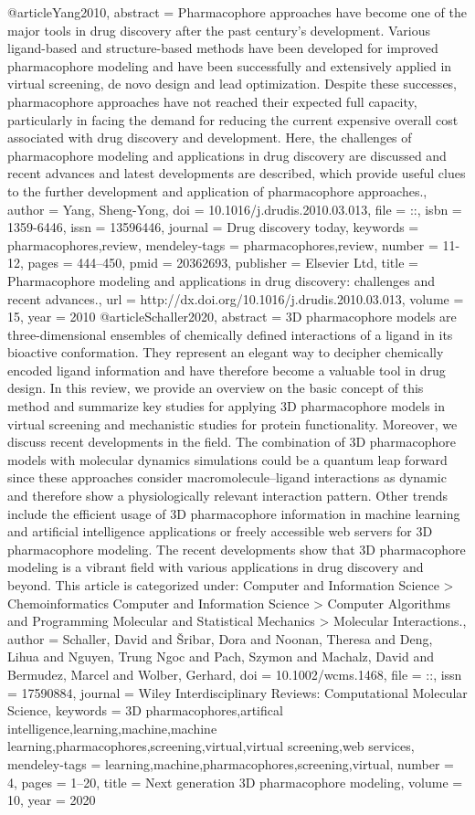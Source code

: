 @article{Yang2010,
abstract = {Pharmacophore approaches have become one of the major tools in drug discovery after the past century's development. Various ligand-based and structure-based methods have been developed for improved pharmacophore modeling and have been successfully and extensively applied in virtual screening, de novo design and lead optimization. Despite these successes, pharmacophore approaches have not reached their expected full capacity, particularly in facing the demand for reducing the current expensive overall cost associated with drug discovery and development. Here, the challenges of pharmacophore modeling and applications in drug discovery are discussed and recent advances and latest developments are described, which provide useful clues to the further development and application of pharmacophore approaches.},
author = {Yang, Sheng-Yong},
doi = {10.1016/j.drudis.2010.03.013},
file = {::},
isbn = {1359-6446},
issn = {13596446},
journal = {Drug discovery today},
keywords = {pharmacophores,review},
mendeley-tags = {pharmacophores,review},
number = {11-12},
pages = {444--450},
pmid = {20362693},
publisher = {Elsevier Ltd},
title = {{Pharmacophore modeling and applications in drug discovery: challenges and recent advances.}},
url = {http://dx.doi.org/10.1016/j.drudis.2010.03.013},
volume = {15},
year = {2010}
}
@article{Schaller2020,
abstract = {3D pharmacophore models are three-dimensional ensembles of chemically defined interactions of a ligand in its bioactive conformation. They represent an elegant way to decipher chemically encoded ligand information and have therefore become a valuable tool in drug design. In this review, we provide an overview on the basic concept of this method and summarize key studies for applying 3D pharmacophore models in virtual screening and mechanistic studies for protein functionality. Moreover, we discuss recent developments in the field. The combination of 3D pharmacophore models with molecular dynamics simulations could be a quantum leap forward since these approaches consider macromolecule–ligand interactions as dynamic and therefore show a physiologically relevant interaction pattern. Other trends include the efficient usage of 3D pharmacophore information in machine learning and artificial intelligence applications or freely accessible web servers for 3D pharmacophore modeling. The recent developments show that 3D pharmacophore modeling is a vibrant field with various applications in drug discovery and beyond. This article is categorized under: Computer and Information Science > Chemoinformatics Computer and Information Science > Computer Algorithms and Programming Molecular and Statistical Mechanics > Molecular Interactions.},
author = {Schaller, David and {\v{S}}ribar, Dora and Noonan, Theresa and Deng, Lihua and Nguyen, Trung Ngoc and Pach, Szymon and Machalz, David and Bermudez, Marcel and Wolber, Gerhard},
doi = {10.1002/wcms.1468},
file = {::},
issn = {17590884},
journal = {Wiley Interdisciplinary Reviews: Computational Molecular Science},
keywords = {3D pharmacophores,artifical intelligence,learning,machine,machine learning,pharmacophores,screening,virtual,virtual screening,web services},
mendeley-tags = {learning,machine,pharmacophores,screening,virtual},
number = {4},
pages = {1--20},
title = {{Next generation 3D pharmacophore modeling}},
volume = {10},
year = {2020}
}
